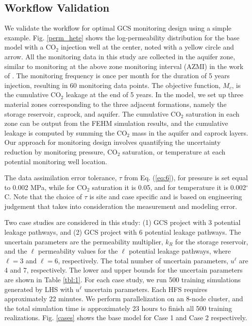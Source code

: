 \documentclass[a4paper,fleqn]{cas-sc}
\begin{document}
\subsection{Workflow Validation}
We validate the workflow for optimal GCS monitoring design using a simple example. Fig. \ref{perm_hete} shows the log-permeability distribution for the base model with a CO$_2$ injection well at the center, noted with a yellow circle and arrow. All the monitoring data in this study are collected in the aquifer zone, similar to monitoring at the above zone monitoring interval (AZMI) in the work of \citet{Sun2013}. The monitoring frequency is once per month for the duration of 5 years injection, resulting in 60 monitoring data points. The objective function, $M_c$, is the cumulative CO$_2$ leakage at the end of 5 years. In the model, we set up three material zones corresponding to the three adjacent formations, namely the storage reservoir, caprock, and aquifer. The cumulative CO$_2$ saturation in each zone can be output from the FEHM simulation results, and the cumulative leakage is computed by summing the CO$_2$ mass in the aquifer and caprock layers. Our approach for monitoring design involves quantifying the uncertainty reduction by monitoring pressure, CO$_2$ saturation, or temperature at each potential monitoring well location. 

The data assimilation error tolerance, $\tau$ from Eq. (\ref{eq:6}), for pressure is set equal to 0.002 MPa, while for CO$_2$ saturation it is 0.05, and for temperature it is 0.002$^\circ$C. Note that the choice of $\tau$ is site and case specific and is based on engineering judgement that takes into consideration the measurement and modeling error.

Two case studies are considered in this study: (1) GCS project with 3 potential leakage pathways, and (2) GCS project with 6 potential leakage pathways. The uncertain parameters are the permeability multiplier, $k_R$ for the storage reservoir, and the $\ell$ permeability values for the $\ell$ potential leakage pathways, where $\ell=3$ and $\ell=6$, respectively. The total number of uncertain parameters, $u^\ell$ are 4 and 7, respectively. The lower and upper bounds for the uncertain parameters are shown in Table \ref{tbl:1}. For each case study, we run 500 training simulations generated by LHS with $u^\ell$ uncertain parameters. Each HFS requires approximately 22 minutes. We perform parallelization on an 8-node cluster, and the total simulation time is approximately 23 hours to finish all 500 training realizations. Fig. \ref{cases} shows the base model for Case 1 and Case 2 respectively.
\end{document}
